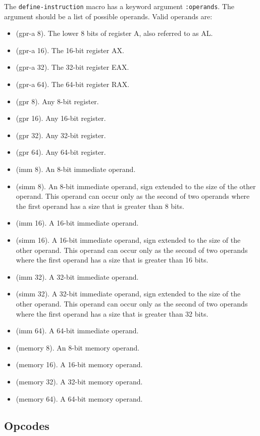 The \texttt{define-instruction} macro has a keyword argument
\texttt{:operands}.  The argument should be a list of possible
operands.  Valid operands are:

\begin{itemize}
\item (gpr-a 8).  The lower 8 bits of register A, also referred to as AL.
\item (gpr-a 16).  The 16-bit register AX.
\item (gpr-a 32).  The 32-bit register EAX.
\item (gpr-a 64).  The 64-bit register RAX.
\item (gpr 8).  Any 8-bit register.
\item (gpr 16).  Any 16-bit register.
\item (gpr 32).  Any 32-bit register.
\item (gpr 64).  Any 64-bit register.
\item (imm 8).  An 8-bit immediate operand.
\item (simm 8).  An 8-bit immediate operand, sign extended to the size
  of the other operand.  This operand can occur only as the second of
  two operands where the first operand has a size that is greater than
  8 bits.
\item (imm 16).  A 16-bit immediate operand.
\item (simm 16).  A 16-bit immediate operand, sign extended to the size
  of the other operand.  This operand can occur only as the second of
  two operands where the first operand has a size that is greater than
  16 bits.
\item (imm 32).  A 32-bit immediate operand.
\item (simm 32).  A 32-bit immediate operand, sign extended to the size
  of the other operand.  This operand can occur only as the second of
  two operands where the first operand has a size that is greater than
  32 bits.
\item (imm 64).  A 64-bit immediate operand.
\item (memory 8).  An 8-bit memory operand.
\item (memory 16).  A 16-bit memory operand.
\item (memory 32).  A 32-bit memory operand.
\item (memory 64).  A 64-bit memory operand.
\end{itemize}

\subsection{Opcodes}

